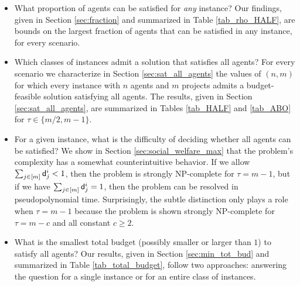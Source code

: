\documentclass{article}
\begin{document}
\begin{itemize}
\item

What proportion of agents can be satisfied for {\em any} instance? Our findings, given in Section \ref{sec:fraction} and summarized in Table \ref{tab_rho_HALF}, are bounds on the largest  fraction of agents that can be satisfied in any instance, for every scenario.

\item

Which classes of instances admit a solution that satisfies all agents? For every scenario we characterize in Section \ref{sec:sat_all_agents} the values of $(n,m)$ for which every instance with $n$ agents and $m$ projects admits a budget-feasible solution satisfying all agents. The results, given in Section \ref{sec:sat_all_agents}, are summarized in Tables \ref{tab_HALF} and \ref{tab_ABO} for $\tau \in \{m/2,m-1\}$.



\item   
For a given instance, what is the difficulty of deciding whether all agents can be satisfied? 
We show in Section \ref{sec:social_welfare_max} that the problem's complexity has a somewhat counterintuitive behavior. %
If we allow $\sum_{j \in [m]} {\sf d}^i_j <1$, then the problem is strongly NP-complete for $\tau=m-1$, but if we have $\sum_{j \in [m]} {\sf d}^i_j =1$, then the problem can be resolved in pseudopolynomial time.  Surprisingly, the subtle distinction only plays a role when $\tau=m-1$ because the problem is shown strongly NP-complete for $\tau=m-c$ and all constant $c\ge 2$. 

\begin{comment}
Finally, finding a solution ${\bf x}$ that maximizes the number of agent-project pairs $(i,j)$ such that $x_j \ge \dell_j^i$ (corresponding to a utilitarian optimum) can be done in polynomial time by dynamic programming. 
\end{comment}

\item What is the smallest total budget 
(possibly smaller or larger than $1$) 
to satisfy all agents? Our results, given in Section \ref{sec:min_tot_bud} and summarized in Table \ref{tab_total_budget}, follow two approaches: answering the question for a single instance or for an entire class of instances. 


\end{itemize}
\end{document}
